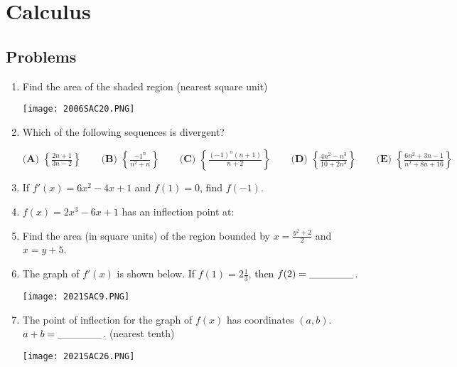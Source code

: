 \documentclass[../uilmath.tex]{subfiles}
\begin{document}
\chapter{Calculus}
\section*{Problems}
\begin{enumerate}[label=\bfseries\arabic*.]
    \item %
    Find the area of the shaded region (nearest square unit)
    \begin{center}
        \texttt{[image: 2006SAC20.PNG]}
    \end{center}

    \item %
    Which of the following sequences is divergent?

    $\textbf{(A) } \left\{\frac{2n+1}{3n-2}\right\}\qquad \textbf{(B) }\left\{\frac{-1^n}{n^2+n}\right\}\qquad \textbf{(C) }\left\{\frac{(-1)^n(n+1)}{n+2}\right\}\qquad \textbf{(D) }\left\{\frac{4n^2-n^3}{10+2n^3}\right\}\qquad \textbf{(E) }\left\{\frac{6n^2+3n-1}{n^2+8n+16}\right\}$

    \item %
    If $f'(x)=6x^2-4x+1$ and $f(1)=0$, find $f(-1)$.

    \item %
    $f(x)=2x^3-6x+1$ has an inflection point at:
    
    \item %
    Find the area (in square units) of the region bounded by $x=\frac{y^2+2}{2}$ and $x=y+5$.

    \item %
    The graph of $f'(x)$ is shown below. If $f(1)=2\frac{1}{3}$, then $f(2)=\_\_\_\_\_\_$.
    \begin{center}
        \texttt{[image: 2021SAC9.PNG]}
    \end{center}
    
    \item %
    The point of inflection for the graph of $f(x)$ has coordinates $(a,b)$. $a+b=\_\_\_\_\_\_$. (nearest tenth)

    \begin{center}
        \texttt{[image: 2021SAC26.PNG]}
    \end{center}




\end{enumerate}
\end{document}
